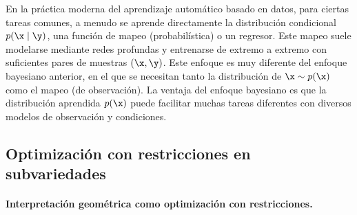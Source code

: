 \documentclass[../../book-main_es.tex]{subfiles}
\begin{document}
\begin{remark}
    En la práctica moderna del aprendizaje automático basado en datos, para
    ciertas tareas comunes, a menudo se aprende directamente la distribución
    condicional $p(\x\mid \y)$, una función de mapeo (probabilística) o un
    regresor. Este mapeo suele modelarse mediante redes profundas
    y entrenarse de extremo a extremo con suficientes pares de muestras $(\x, \y)$.
    Este enfoque es muy diferente del enfoque bayesiano anterior,
    en el que se necesitan tanto la distribución de $\x \sim p(\x)$ como
    el mapeo (de observación). La ventaja del enfoque bayesiano
    es que la distribución aprendida $p(\x)$ puede facilitar
    muchas tareas diferentes con diversos modelos de observación y condiciones.
\end{remark}

\subsection{Optimización con restricciones en subvariedades}
\label{sec:manifold-distance}
\paragraph{Interpretación geométrica como optimización con restricciones.}
\end{document}
